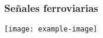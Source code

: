 \subsubsection{Señales ferroviarias}

\lipsum[1]

\lipsum[1]
\texttt{[image: example-image]}
\lipsum[1]